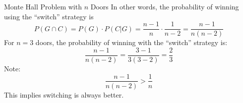 \documentclass[
  ignorenonframetext,
]{beamer}
\begin{document}
\begin{frame}{Monte Hall Problem with \(n\) Doors}
\protect\hypertarget{monte-hall-problem-with-n-doors-1}{}
In other words, the probability of winning using the ``switch'' strategy
is
\[P(G \cap C)=P(G)\cdot P(C|G)=\frac{n-1}{n}\cdot \frac{1}{n-2}=\frac{n-1}{n(n-2)}\]
For \(n=3\) doors, the probability of winning with the ``switch''
strategy is: \[\frac{n-1}{n(n-2)}=\frac{3-1}{3(3-2)}=\frac{2}{3}\] Note:
\[\frac{n-1}{n(n-2)}> \frac{1}{n}\] This implies switching is always
better.
\end{frame}
\end{document}
